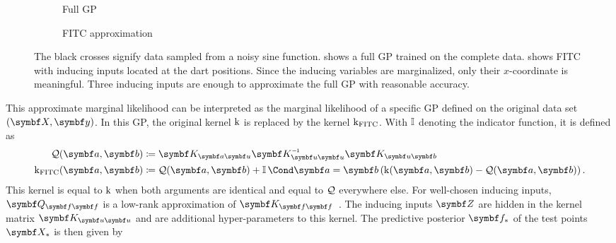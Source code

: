 \begin{figure}[tp]
    \begin{subfigure}{\halffigurewidth}
        \centering
        \caption{Full GP
            \label{fig:sparse_gp:spgp_example:gp}
        }
    \end{subfigure}
    \hfill
    \begin{subfigure}{\halffigurewidth}
        \centering
        \caption{
            FITC approximation
            \label{fig:sparse_gp:spgp_example:spgp}
        }
    \end{subfigure}
    \caption[FITC example]{
        The black crosses signify data sampled from a noisy sine function.
         shows a full GP trained on the complete data.
         shows FITC with inducing inputs located at the dart positions.
        Since the inducing variables are marginalized, only their $x$-coordinate is meaningful.
        Three inducing inputs are enough to approximate the full GP with reasonable accuracy.
        \label{fig:sparse_gp:spgp_example}
    }
\end{figure}
This approximate marginal likelihood can be interpreted as the marginal likelihood of a specific GP defined on the original data set $(\mat{X}, \mat{y})$.
In this GP, the original kernel $\operatorname{k}$ is replaced by the kernel $\operatorname{k}_{\text{FITC}}$.
With $\operatorname{\mathbb{I}}$ denoting the indicator function, it is defined as
\begin{align}
    \begin{split}
        \Qc(\mat{a}, \mat{b}) &\coloneqq \mat{K}_{\mat{a}\mat{u}} \mat{K}_{\mat{u}\mat{u}}\inv\mat{K}_{\mat{u}\mat{b}} \\
        \K_{\text{FITC}}(\mat{a}, \mat{b}) &\coloneqq \Qc(\mat{a}, \mat{b}) + \Indicator{\mat{a} = \mat{b}} \left( \K(\mat{a}, \mat{b}) - \Qc(\mat{a}, \mat{b}) \right).
    \end{split}
\end{align}
This kernel is equal to $\operatorname{k}$ when both arguments are identical and equal to $\mathcal{Q}$ everywhere else.
For well-chosen inducing inputs, $\mat{Q}_{\mat{f}\mat{f}}$ is a low-rank approximation of $\mat{K}_{\mat{f}\mat{f}}$~\parencite{snelson_flexible_2007}.
The inducing inputs $\mat{Z}$ are hidden in the kernel matrix $\mat{K}_{\mat{u}\mat{u}}$ and are additional hyper-parameters to this kernel.
The predictive posterior $\mat{f_\ast}$ of the test points $\mat{X_\ast}$ is then given by
